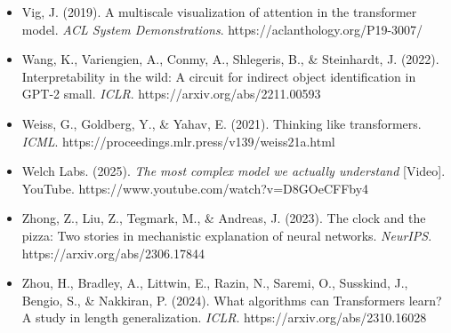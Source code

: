 \documentclass[
  11pt,
  a4paper,
]{article}
\begin{document}
\begin{itemize}
  need. \emph{Advances in Neural Information Processing Systems}, 30.
  https://arxiv.org/abs/1706.03762
\item
  Vig, J. (2019). A multiscale visualization of attention in the
  transformer model. \emph{ACL System Demonstrations}.
  https://aclanthology.org/P19-3007/
\item
  Wang, K., Variengien, A., Conmy, A., Shlegeris, B., \& Steinhardt, J.
  (2022). Interpretability in the wild: A circuit for indirect object
  identification in GPT-2 small. \emph{ICLR}.
  https://arxiv.org/abs/2211.00593
\item
  Weiss, G., Goldberg, Y., \& Yahav, E. (2021). Thinking like
  transformers. \emph{ICML}.
  https://proceedings.mlr.press/v139/weiss21a.html
\item
  Welch Labs. (2025). \emph{The most complex model we actually
  understand} {[}Video{]}. YouTube.
  https://www.youtube.com/watch?v=D8GOeCFFby4
\item
  Zhong, Z., Liu, Z., Tegmark, M., \& Andreas, J. (2023). The clock and
  the pizza: Two stories in mechanistic explanation of neural networks.
  \emph{NeurIPS}. https://arxiv.org/abs/2306.17844
\item
  Zhou, H., Bradley, A., Littwin, E., Razin, N., Saremi, O., Susskind,
  J., Bengio, S., \& Nakkiran, P. (2024). What algorithms can
  Transformers learn? A study in length generalization. \emph{ICLR}.
  https://arxiv.org/abs/2310.16028
\end{itemize}

\endgroup
\end{document}
